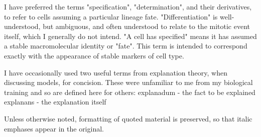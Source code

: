 I have preferred the terms "specification", "determination", and their derivatives, to refer to cells assuming a particular lineage fate. "Differentiation" is well-understood, but ambiguous, and often understood to relate to the mitotic event itself, which I generally do not intend. "A cell has specified" means it has assumed a stable macromolecular identity or "fate". This term is intended to correspond exactly with the appearance of stable markers of cell type.

I have occasionally used two useful terms from explanation theory, when discussing models, for concision. These were unfamiliar to me from my biological training and so are defined here for others:
explanadum - the fact to be explained
explanans - the explanation itself 

Unless otherwise noted, formatting of quoted material is preserved, so that italic emphases appear in the original.